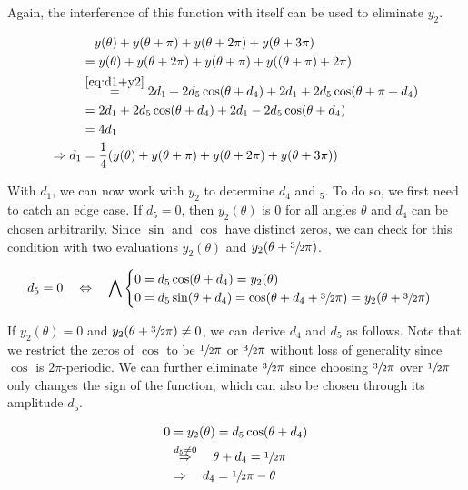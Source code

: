 Again, the interference of this function with itself can be used to eliminate
$y_2$.

\begin{equation}
    \label{eq:d1}
    \begin{split}
        &\quad y(\theta) + y(\theta + \pi) + y(\theta + 2\pi) + y(\theta + 3\pi)\\
            &= y(\theta) + y(\theta + 2\pi) + y(\theta + \pi) + y((\theta + \pi) + 2\pi)\\
            &\stackrel{\ref{eq:d1+y2}}= 2d_1 + 2d_5\cos(\theta + d_4) + 2d_1 + 2d_5\cos(\theta + \pi + d_4)\\
            &= 2d_1 + 2d_5\cos(\theta + d_4) + 2d_1 - 2d_5\cos(\theta + d_4)\\
            &= 4d_1\\
        \Rightarrow d_1 &= \frac14(y(\theta) + y(\theta + \pi) + y(\theta + 2\pi) + y(\theta + 3\pi))
    \end{split}
\end{equation}

With $d_1$, we can now work with $y_2$ to determine $d_4$ and $_5$.
To do so, we first need to catch an edge case.
If $d_5 = 0$, then $y_2(\theta)$ is $0$ for all angles $\theta$ and $d_4$ can be
chosen arbitrarily.
Since $\sin$ and $\cos$ have distinct zeros, we can check for this condition
with two evaluations $y_2(\theta)$ and $y_2(\theta + \sfrac32\pi)$.

\begin{equation}
    \label{eq:d5-0}
    d_5 = 0 \quad\Leftrightarrow\quad\bigwedge
    \begin{cases}
        0 = d_5 \cos(\theta + d_4) = y_2(\theta) \\
        0 = d_5 \sin(\theta + d_4) = \cos(\theta + d_4 + \sfrac32\pi) = y_2(\theta + \sfrac32\pi)
    \end{cases}
\end{equation}

If $y_2(\theta) = 0$ and $y_2(\theta + \sfrac32\pi) \neq 0$, we can derive
$d_4$ and $d_5$ as follows.
Note that we restrict the zeros of $\cos$ to be $\sfrac12\pi$ or $\sfrac32\pi$
without loss of generality since $\cos$ is $2\pi$-periodic.
We can further eliminate $\sfrac32\pi$ since choosing $\sfrac32\pi$ over
$\sfrac12\pi$ only changes the sign of the function, which can also be chosen
through its amplitude $d_5$.

\begin{equation}
    \label{eq:whateverman}
    \begin{split}
        0 &= y_2(\theta) = d_5 \cos(\theta + d_4) \\
        &\stackrel{d_5 \neq 0}\Rightarrow\quad \theta + d_4 = \sfrac12\pi\\
        &\Rightarrow\quad d_4 =\sfrac12\pi - \theta
    \end{split}
\end{equation}

